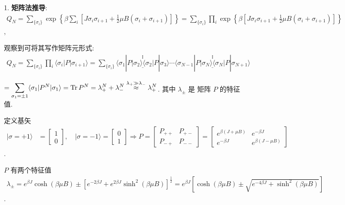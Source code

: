 \documentclass[../../main.tex]{subfiles}
\begin{document}
1. \textbf{矩阵法推导}: $\begin{aligned}
    Q_{N} = \sum_{\{\sigma_{i}\}}\exp\left\{
        \beta \sum_{i}\left[J\sigma_{i}\sigma_{i+1} + \frac{1}{2}\mu B(\sigma_{i}+\sigma_{i+1})\right]\right\} = \sum_{\{\sigma_{i}\}}\prod_{i}\exp\left\{\beta\left[
                J\sigma_{i}\sigma_{i+1}+\frac{1}{2}\mu B(\sigma_{i}+\sigma_{i+1})
                \right]\right\}
\end{aligned}$, 

观察到可将其写作矩阵元形式: $\begin{aligned}
    Q_{N} 
    = \sum_{\{\sigma_{i}\}}\prod_{i}\langle\sigma_{i}|P|\sigma_{i+1}\rangle 
    = \sum_{\{\sigma_{i}\}}\langle \sigma_{1}|P\stackrel{\mathbb{I}}{\underline{|\sigma_{2}\rangle\langle \sigma_{2}|}}P|\sigma_{3}\rangle\cdots\langle\sigma_{N-1}|P\stackrel{\mathbb{I}}{\underline{|\sigma_{N}\rangle\langle\sigma_{N}|}}P|\sigma_{N+1}\rangle
\end{aligned}$

$\begin{aligned}
     = \sum_{\sigma_{1}=\pm 1}\langle \sigma_{1}|P^{N}|\sigma_{1}\rangle 
     = \operatorname{Tr}{P^{N}}
     = \lambda_{+}^{N} + \lambda_{-}^{N}\stackrel{\lambda_{+}\gg \lambda_{-}}{\approx} \lambda_{+}^{N}
\end{aligned}$. 其中 $\lambda_{\pm}$ 是 矩阵 $P$ 的特征值.

定义基矢 $\begin{aligned}
    |\sigma=+1\rangle &= \begin{bmatrix}
        1\\0
    \end{bmatrix},\quad |\sigma=-1\rangle = \begin{bmatrix}
        0\\1
    \end{bmatrix}\Rightarrow 
    P = \begin{bmatrix}
        P_{++} & P_{+-}\\P_{-+} & P_{--}
    \end{bmatrix} = \begin{bmatrix}
        e^{\beta(J+\mu B)} & e^{-\beta J}\\
        e^{-\beta J} & e^{\beta(J-\mu B)}
    \end{bmatrix}
\end{aligned}$. 

$P$ 有两个特征值 $\begin{aligned}
    \lambda_{\pm}=e^{\beta J}\cosh{(\beta\mu B)}\pm [e^{-2\beta J}+e^{2\beta J}\sinh^{2}{(\beta\mu B)}]^{\frac{1}{2}} = e^{\beta J}\left[
        \cosh{(\beta\mu B)}\pm \sqrt{e^{-4\beta J}+\sinh^{2}{(\beta\mu B)}}
    \right]
\end{aligned}$. 
\end{document}
